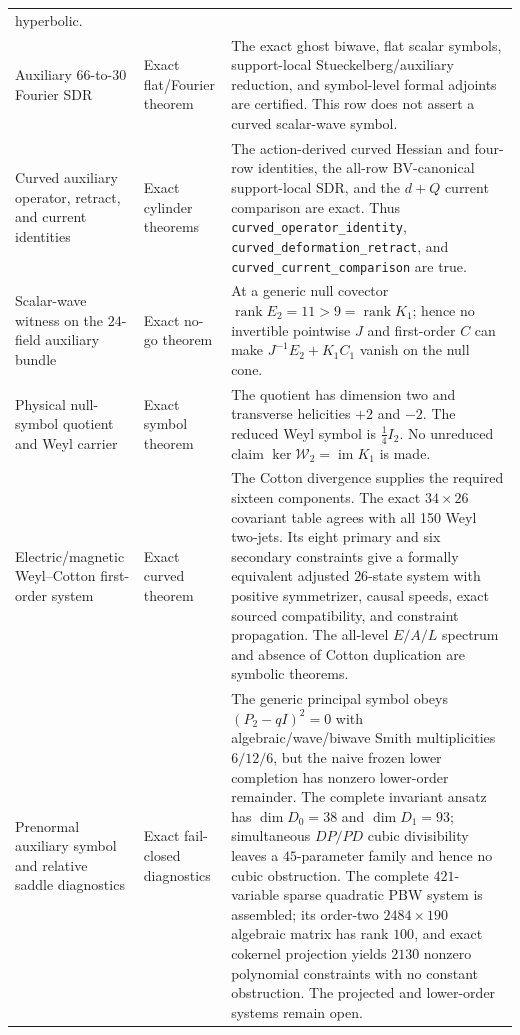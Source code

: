 \documentclass[11pt]{article}
\theoremstyle{definition}
\theoremstyle{remark}
\newcommand{\W}{\mathcal W}
\newcommand{\im}{\operatorname{im}}
\newcommand{\rank}{\operatorname{rank}}
\begin{document}
{\begin{longtable}{>{\raggedright\arraybackslash}p{}
                >{\raggedright\arraybackslash}p{}
                >{\raggedright\arraybackslash}p{}}
hyperbolic.\\
Auxiliary $66$-to-$30$ Fourier SDR & Exact flat/Fourier theorem & The exact
ghost biwave, flat scalar symbols, support-local Stueckelberg/auxiliary
reduction, and symbol-level formal adjoints are certified.  This row does not
assert a curved scalar-wave symbol.\\
Curved auxiliary operator, retract, and current identities & Exact cylinder
theorems & The action-derived curved Hessian and four-row identities, the
all-row BV-canonical support-local SDR, and the $d+Q$ current comparison are
exact.  Thus \texttt{curved\_operator\_identity},
\texttt{curved\_deformation\_retract}, and
\texttt{curved\_current\_comparison} are true.\\
Scalar-wave witness on the $24$-field auxiliary bundle & Exact no-go theorem
& At a generic null covector $\rank E_2=11>9=\rank K_1$; hence no invertible
pointwise $J$ and first-order $C$ can make
$J^{-1}E_2+K_1C_1$ vanish on the null cone.\\
Physical null-symbol quotient and Weyl carrier & Exact symbol theorem & The
quotient has dimension two and transverse helicities $+2$ and $-2$.  The
reduced Weyl symbol is $\frac14I_2$.  No unreduced claim
$\ker\W_2=\im K_1$ is made.\\
Electric/magnetic Weyl--Cotton first-order system & Exact curved theorem &
The Cotton divergence supplies the required sixteen components.  The exact
$34\times26$ covariant table agrees with all 150 Weyl two-jets.  Its eight
primary and six secondary constraints give a formally equivalent adjusted
$26$-state system with positive symmetrizer, causal speeds, exact sourced
compatibility, and constraint propagation.  The all-level $E/A/L$ spectrum
and absence of Cotton duplication are symbolic theorems.\\
Prenormal auxiliary symbol and relative saddle diagnostics & Exact
fail-closed diagnostics & The generic principal symbol obeys
$(P_2-qI)^2=0$ with algebraic/wave/biwave Smith multiplicities $6/12/6$,
but the naive frozen lower completion has nonzero lower-order remainder.
The complete invariant ansatz has $\dim D_0=38$ and $\dim D_1=93$;
simultaneous $DP/PD$ cubic divisibility leaves a $45$-parameter family and
hence no cubic obstruction.  The complete $421$-variable sparse quadratic
PBW system is assembled; its order-two $2484\times190$ algebraic matrix has
rank $100$, and exact cokernel projection yields $2130$ nonzero polynomial
constraints with no constant obstruction.  The projected and lower-order
systems remain open.

\end{longtable}}
\end{document}
